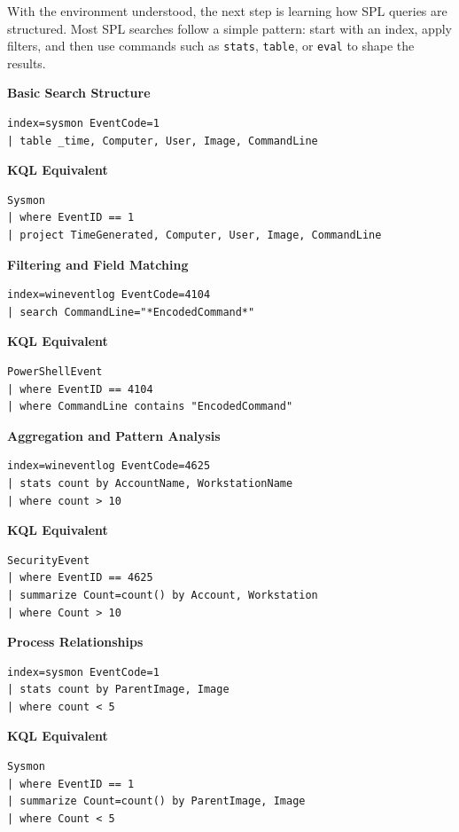 With the environment understood, the next step is learning how SPL queries are structured. 
Most SPL searches follow a simple pattern: start with an index, apply filters, and then use commands such as 
\texttt{stats}, \texttt{table}, or \texttt{eval} to shape the results.

\textbf{Basic Search Structure}

\begin{lstlisting}
index=sysmon EventCode=1
| table _time, Computer, User, Image, CommandLine
\end{lstlisting}

\textbf{KQL Equivalent}

\begin{lstlisting}
Sysmon
| where EventID == 1
| project TimeGenerated, Computer, User, Image, CommandLine
\end{lstlisting}

\textbf{Filtering and Field Matching}

\begin{lstlisting}
index=wineventlog EventCode=4104
| search CommandLine="*EncodedCommand*"
\end{lstlisting}

\textbf{KQL Equivalent}

\begin{lstlisting}
PowerShellEvent
| where EventID == 4104
| where CommandLine contains "EncodedCommand"
\end{lstlisting}

\textbf{Aggregation and Pattern Analysis}

\begin{lstlisting}
index=wineventlog EventCode=4625
| stats count by AccountName, WorkstationName
| where count > 10
\end{lstlisting}

\textbf{KQL Equivalent}

\begin{lstlisting}
SecurityEvent
| where EventID == 4625
| summarize Count=count() by Account, Workstation
| where Count > 10
\end{lstlisting}

\textbf{Process Relationships}

\begin{lstlisting}
index=sysmon EventCode=1
| stats count by ParentImage, Image
| where count < 5
\end{lstlisting}

\textbf{KQL Equivalent}

\begin{lstlisting}
Sysmon
| where EventID == 1
| summarize Count=count() by ParentImage, Image
| where Count < 5
\end{lstlisting}

